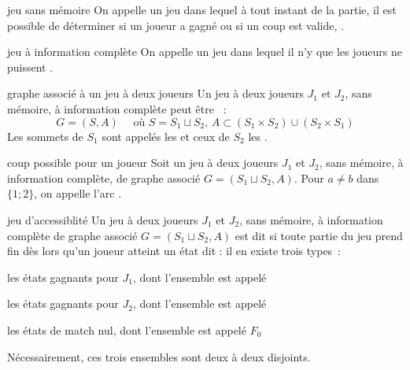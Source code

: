 

\begin{adjustwidth}{-3cm}{-3cm}


\begin{definition}{4.1}{jeu sans mémoire}
    On appelle  un jeu dans lequel à tout instant de la partie, il est possible de déterminer si un joueur a gagné ou si un coup est valide, .
\end{definition}

\begin{definition}{4.2}{jeu à information complète}
    On appelle  un jeu dans lequel il n'y  que les joueurs ne puissent .
\end{definition}

\begin{definition}{4.3}{graphe associé à un jeu à deux joueurs}
    Un jeu à deux joueurs $J_1$ et $J_2$, sans mémoire, à information complète peut être ~:
    $$G = (S,A) \quad \text{ où } S = S_1 \sqcup S_2,\, A \subset (S_1 \times S_2) \cup (S_2 \times S_1) $$
    Les sommets de $S_1$ sont appelés les  et ceux de $S_2$ les .
\end{definition}

\begin{definition}{4.4}{coup possible pour un joueur}
    Soit un jeu à deux joueurs $J_1$ et $J_2$, sans mémoire, à information complète, de graphe associé $G=(S_1 \sqcup S_2,A)$. Pour $a \neq b$ dans $\{1;2\}$, on appelle l'arc .
\end{definition}

\begin{definition}{4.5}{jeu d'accessiblité}
    Un jeu à deux joueurs $J_1$ et $J_2$, sans mémoire, à information complète de graphe associé $G=(S_1 \sqcup S_2,A)$ est dit  si toute partie du jeu prend fin dès lors qu'un joueur atteint un état dit  : il en existe trois types~:
    \begin{enumeratebf}
        \item les états gagnants pour $J_1$, dont l'ensemble est appelé 
        \item les états gagnants pour $J_2$, dont l'ensemble est appelé 
        \item les états de match nul, dont l'ensemble est appelé $F_0$
    \end{enumeratebf}
    Nécessairement, ces trois ensembles sont deux à deux disjoints.
\end{definition}


\end{adjustwidth}
